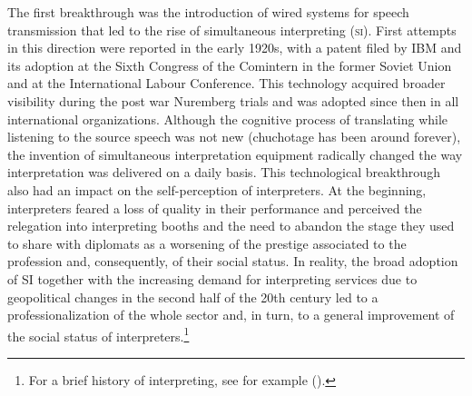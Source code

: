 \documentclass[output=paper]{langsci/langscibook}
\begin{document}
The first breakthrough was the introduction of wired systems for speech transmission that led to the rise of simultaneous interpreting (\textsc{si}). First attempts in this direction were reported in the early 1920s, with a patent filed by IBM and its adoption at the Sixth Congress of the Comintern in the former Soviet Union and at the International Labour Conference. This technology acquired broader visibility during the post war Nuremberg trials and was adopted since then in all international organizations. Although the cognitive process of translating while listening to the source speech was not new (chuchotage has been around forever), the invention of simultaneous interpretation equipment radically changed the way interpretation was delivered on a daily basis. This technological breakthrough also had an impact on the self-perception of interpreters. At the beginning, interpreters feared a loss of quality in their performance and perceived the relegation into interpreting booths and the need to abandon the stage they used to share with diplomats as a worsening of the prestige associated to the profession and, consequently, of their social status. In reality, the broad adoption of SI together with the increasing demand for interpreting services due to geopolitical changes in the second half of the 20th century led to a professionalization of the whole sector and, in turn, to a general improvement of the social status of interpreters.\footnote{For a brief history of interpreting, see for example \citeauthor{takeda_new_2016} (\citeyear{takeda_new_2016}).} 
 
\end{document}

